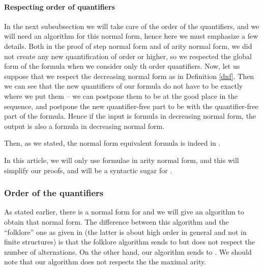 \documentclass[a4paper,12pt]{article}
\newcommand{\sss}[1]{\subsubsection{#1}}
\theoremstyle{definition}
\begin{document}
\paragraph{Respecting order of quantifiers}
In the next subsubsection we will take care of the order of the
quantifiers, and we will need an algorithm for this normal form, hence
here we must emphasize a few details. Both in the proof of step normal
form and of arity normal form, we did not create any new
quantification of order  or higher, so we respected the global form
of the formula when we consider only th order quantifiers. Now, let
us suppose that we respect the decreasing normal form as in Definition
\ref{dnf}. Then we can see that the new quantifiers of our formula do
not have to be exactly where we put them -- we can postpone them to be
at the good place in the sequence, and postpone the new quantifier-free
part to be with the quantifier-free part of the formula. Hence if the
input is formula in decreasing normal form, the output is also a
formula in decreasing normal form.


Then, as we stated, the normal form equivalent formula is indeed in
.

In this article, we will only use formulae in arity normal form,
and this will simplify our proofs, and  will be a
syntactic sugar for .

\sss{Order of the quantifiers}
\label{sec:normalform}
As stated earlier, there is a normal form for  and we will
give an algorithm to obtain that normal form. The difference between
this algorithm and the ``folklore'' one as given in
\cite{lauri,Leivant94higherorder} (the latter is about high order in
general and not in finite structures) is that the folklore algorithm
sends  to  but does not respect the number of
alternations. On the other hand, our algorithm sends  to
. We should note that our algorithm does not respects the
the maximal arity.
\end{document}
